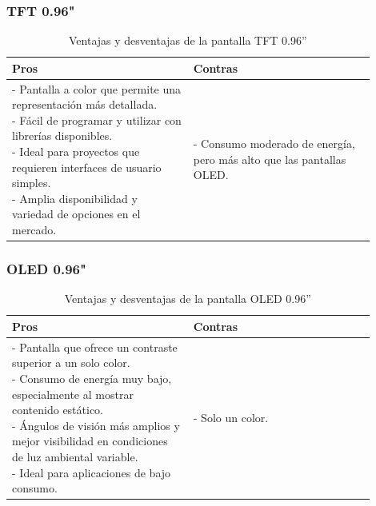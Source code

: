 \subsubsection{\gls{TFT} 0.96"}
\begin{table}[H]
\centering
\small
\begin{tabular}{|p{0.45\linewidth}|p{0.45\linewidth}|}
\hline
\textbf{Pros} &
\textbf{Contras} \\
\hline
\parbox[t]{\linewidth}{
\vspace{0.1cm}
- Pantalla a color que permite una representación más detallada. \medskip \\
- Fácil de programar y utilizar con librerías disponibles. \medskip \\
- Ideal para proyectos que requieren interfaces de usuario simples. \medskip \\
- Amplia disponibilidad y variedad de opciones en el mercado. \vspace{0.1cm}
} &
\parbox[t]{\linewidth}{
\vspace{0.1cm}
- Consumo moderado de energía, pero más alto que las pantallas \gls{OLED}. \medskip \\
\vspace{0.1cm}
} \\
\hline
\end{tabular}
\caption{Ventajas y desventajas de la pantalla TFT 0.96''}
\end{table}

\subsubsection{OLED 0.96"}
\begin{table}[H]
\centering
\small
\begin{tabular}{|p{0.45\linewidth}|p{0.45\linewidth}|}
\hline
\textbf{Pros} &
\textbf{Contras} \\
\hline
\parbox[t]{\linewidth}{
\vspace{0.1cm}
- Pantalla que ofrece un contraste superior a un solo color. \medskip \\
- Consumo de energía muy bajo, especialmente al mostrar contenido estático. \medskip \\
- Ángulos de visión más amplios y mejor visibilidad en condiciones de luz ambiental variable. \medskip \\
- Ideal para aplicaciones de bajo consumo. \medskip \\
\vspace{0.1cm}
} &
\parbox[t]{\linewidth}{
\vspace{0.1cm}
- Solo un color. \vspace{0.1cm}
} \\
\hline
\end{tabular}
\caption{Ventajas y desventajas de la pantalla OLED 0.96''}
\end{table}

